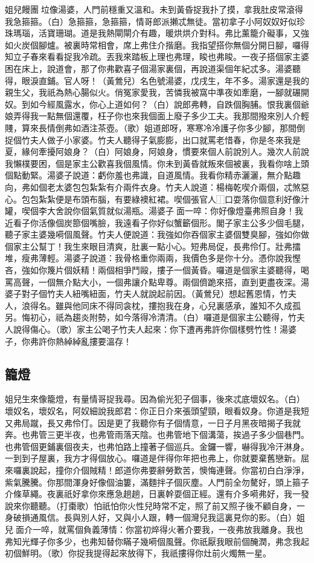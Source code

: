 姐兒饅團𨶑垃像湯婆，人門前穩重又溫和。未到黃昏捉我扑了摸，拿我肚皮常滾得我急箍箍。（白）急箍箍，急箍箍，情哥郎派攋忒無徒。當初拿子小阿奴奴好似珍珠瑪瑙，活寶珊瑚。道是我熱閘閘介有趣，暖烘烘介對科。弗比薰籠介礙事，又強如火炭個腳爐。被裏時常相會，席上弗住介揩磨。我指望搭你無個分開日腳，囉得知立子春來看看捉我冷疏。丟我來踏板上理也弗理，睃也弗睃。一夜子搭個家主婆困在床上，說道會，那了你弗歡喜子個湯家裏個，再說道渠個年紀忒多。湯婆聽得，眼淚直鋪。官人呀！（黃鶯兒）名色號湯婆，戊戌生，年不多。湯家還是我的親生父，我祇為熱心腸似火。俏冤家愛我，苦憐我被窩中準夜如牽磨，一腳就碾開奴。到如今經風露水，你心上道如何？（白）說郎弗轉，自跌個胸脯。恨我裏個爺娘弄得我一點無個還覆，枉子你也來我個面上廢子多少工夫。我那間撥來別人介輕賤，算來長情倒弗如酒注茶壺。（歌）姐道郎呀，寒寒冷冷護子你多少腳，那間倒捉個竹夫人做子小家婆。竹夫人聽得子氣膨膨，出口就罵老惜春，你是冬來我是夏，緣何牽擾阿娘身？（白）阿娘身，阿娘身，慣要來個人前說別人。幾次人前說我懶樸要困，個是家主公歡喜我個風情。你未到黃昏就叛來個被裏，我看你啥上頭個點動緊。湯婆子說道：虧你羞也弗識，自道風情。我看你精赤灑灑，無介點趣向，弗如個老太婆包包紮紮有介兩件衣身。竹夫人說道：楊梅乾喫介兩個，忒煞惡心。包包紮紮便是布頭布腦，有要綠襖紅裙。喫個張官人⿰口耍落你個意利好像汁罐，喫個李大舍說你個氣質就似湯瓶。湯婆子𠹥面一啐：你好像燈臺弗照自身！我近看子你活像個炭篰個嘴臉，我遠看子你好似蟹籪個形。閣子家主公多少個毛腿，聽子家主婆幾嗬個風聲。竹夫人便說道：我強如你吞個家主婆個雙臭腳，強如你做個家主公幫丁！我生來眼目清爽，肚裏一點小心。短弗局促，長弗伶仃。壯弗擂堆，瘦弗薄輕。湯婆子說道：我骨格重你兩兩，我價色多是你十分。憑你說我慳吝，強如你篾片個妖精！兩個相爭鬥毆，摟子一個黃昏。囉道是個家主婆聽得，喝罵高聲，一個無介點大小，一個弗讓介點卑尊。兩個儕跪來搭，直到更盡夜深。湯婆子對子個竹夫人紐嘴紐面，竹夫人就說起前因。（黃鶯兒）想起舊恩情，竹夫人，浪得名。雖與他同床不得同衾枕，摟抱我在身，心兒裏感承，誰知不久成孤另。悔初心，祇為趨炎附勢，如今落得冷清清。（白）囉道是個家主公聽得，竹夫人說得傷心。（歌）家主公喝子竹夫人起來：你下遭再弗許你個樣劈竹性！湯婆子，你弗許你熱綽綽亂摟要溫存！

\subsection*{籠燈}

姐兒生來像籠燈，有量情哥捉我尋。因為偷光犯子個事，後來忒底壞奴名。（白）壞奴名，壞奴名，阿奴細說我郎君：你正日介來張頭望頸，眼看奴身。你道是我短又弗局蹴，長又弗伶仃。因是更了我聽你有子個情意，一日子月黑夜暗揭子我就奔。也弗管三更半夜，也弗管雨落天陰。也弗管地下個溝蕩，挨過子多少個巷門。也弗管個更鋪裏個夜夫，也弗怕路上撞著子個巡兵。金鑼一響，嚇得我冷汗淋身。一到到子屋裏，我方才得個放心。囉道是伴得你年把也弗上，你就要棄舊戀新。屈來囉裏說起，撞你介個賊精！郎道你弗要辭勞歎苦，懊悔連聲。你當初白白淨淨，紫氣騰騰。你那間渾身好像個油簍，滿麵拌子個灰塵。人門前全勿驁好，頭上箍子介條草繩。夜裏祇好拿你來應急趟趟，日裏幹耍個正經。還有介多嗬弗好，我一發說來你聽聽。（打棗歌）怕祇怕你火性兒時常不定，照了前又照子後不顧自身，一身破損通風信。長與別人好，又與小人跟，轉一個灣兒我這裏見你的影。（白）姐兒𠹥面介一啐，就罵個負義薄情：你當初焠得火著介要我，一夜弗放我離身。我也弗知光輝子你多少，也弗知替你瞞子幾嗬個風聲。你祇厭我眼前個醃潤，弗念我起初個鮮明。（歌）你捉我提得起來放得下，我祇摟得你灶前火燭無一星。

